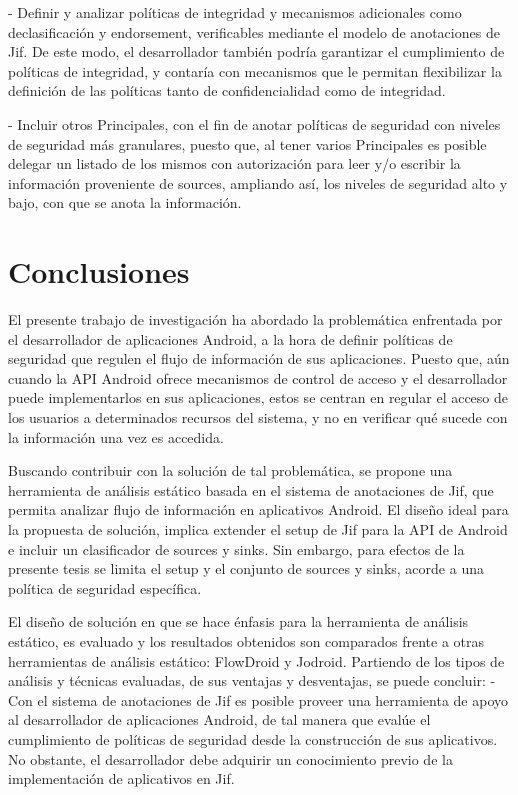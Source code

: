 - Definir y analizar políticas de integridad y mecanismos adicionales como
declasificación y endorsement, verificables mediante el modelo de anotaciones de
Jif. De este modo, el desarrollador también podría garantizar el cumplimiento de
políticas de integridad, y contaría con mecanismos que le permitan flexibilizar
la definición de las políticas tanto de confidencialidad como de integridad.

- Incluir otros Principales, con el fin de anotar políticas de seguridad con
niveles de seguridad más granulares, puesto que, al tener varios Principales
es posible delegar un listado de los mismos con autorización para leer y/o
escribir la información proveniente de sources, ampliando así, los niveles de
seguridad alto y bajo, con que se anota la información.

\section{Conclusiones}
El presente trabajo de investigación ha abordado la problemática enfrentada por
el desarrollador de aplicaciones Android, a la hora de definir políticas de
seguridad que regulen el flujo de información de sus aplicaciones. Puesto que,
aún cuando la API Android ofrece mecanismos de control de acceso y el
desarrollador puede implementarlos en sus aplicaciones, estos se centran en
regular el acceso de los usuarios a determinados recursos del sistema, y no en
verificar qué sucede con la información una vez es accedida.

Buscando contribuir con la solución de tal problemática, se propone una
herramienta de análisis estático basada en el sistema de anotaciones de Jif, que
permita analizar flujo de información en aplicativos Android. El diseño ideal
para la propuesta de solución, implica extender el setup de Jif para la API de
Android e incluir un clasificador de sources y sinks. Sin embargo, para efectos
de la presente tesis se limita el setup y el conjunto de sources y sinks, acorde
a una política de seguridad específica.

El diseño de solución en que se hace énfasis para la herramienta de análisis
estático, es evaluado y los resultados obtenidos son comparados frente a otras
herramientas de análisis estático: FlowDroid y Jodroid. Partiendo de los tipos
de análisis y técnicas evaluadas, de sus ventajas y desventajas, se
puede concluir:\newline 
- Con el sistema de anotaciones de Jif es posible proveer una
herramienta de apoyo al desarrollador de aplicaciones Android, de tal manera que evalúe el
cumplimiento de políticas de seguridad desde la construcción de sus aplicativos.\\
No obstante, el desarrollador debe adquirir un conocimiento previo de la
implementación de aplicativos en Jif.

